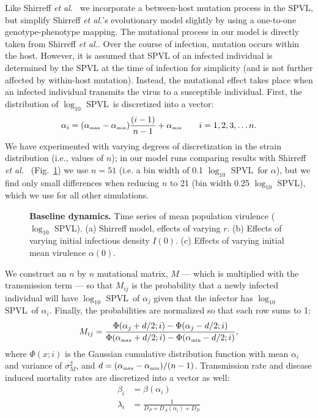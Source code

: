 \documentclass[10pt,letterpaper]{article}
\newcommand{\tsub}[2]{#1_{{\textrm{\tiny #2}}}}
\newcommand{\Lspvl}{$\log_{10}$ SPVL}
\newcommand{\etal}{\textit{et al.}}
\newcommand{\tsub}[2]{#1_{{\textrm{\tiny #2}}}}
\begin{document}
Like Shirreff \etal\ \cite{shirreff_transmission_2011} we incorporate a between-host mutation process in the SPVL, but simplify Shirreff \etal's evolutionary model slightly by using a one-to-one genotype-phenotype mapping. 
The mutational process in our model is directly taken from Shirreff \etal. Over the course of infection, mutation occurs within the host. However, it is assumed that SPVL of an infected individual is determined by the SPVL at the time of infection for simplicity (and is not further affected by within-host mutation). Instead, the mutational effect takes place when an infected individual transmits the virus to a susceptible individual. First, the distribution of \Lspvl\ is discretized into a vector:
\begin{equation}
\alpha_i =  (\tsub{\alpha}{max} - \tsub{\alpha}{min})\frac{(i-1)}{n-1} + \tsub{\alpha}{min} \qquad i = 1,2,3, \dots n.
\end{equation}
We have experimented with varying degrees of discretization in the strain distribution (i.e., values of $n$); in our model runs comparing results with Shirreff \etal\ \cite{shirreff_transmission_2011} (Fig.~\ref{fig:panel3}) we use $n=51$ (i.e. a bin width of 0.1 \Lspvl\ for $\alpha$), but we find only small differences when reducing $n$ to 21 (bin width 0.25 \Lspvl), which we use for all other simulations.

\begin{figure}[!h]
\caption{{\bf Baseline dynamics.}
Time series of mean population virulence (\Lspvl). (a) Shirreff model, effects of varying $r$. (b) Effects of varying initial infectious density $I(0)$. (c) Effects of varying initial mean virulence $\alpha(0)$.}
\label{fig:panel3}
\end{figure}

We construct an $n$ by $n$ mutational matrix, $M$ --- which is multiplied with the transmission term ---  so that $M_{ij}$ is the probability that a newly infected individual will have \Lspvl\ of $\alpha_j$ given that the infector has \Lspvl\ of $\alpha_i$. Finally, the probabilities are normalized so that each row sums to 1:
\begin{equation}
M_{ij} = \frac{\Phi(\alpha_j + d/2;i) - \Phi(\alpha_j - d/2;i)}{\Phi(\tsub{\alpha}{max} + d/2;i) - \Phi(\tsub{\alpha}{min} - d/2;i)},
\end{equation}
where $\Phi(x;i)$ is the Gaussian cumulative distribution function with mean $\alpha_i$ and variance of $\sigma_M^2$, and $d = (\tsub{\alpha}{max} - \tsub{\alpha}{min})/(n-1)$. Transmission rate and disease induced mortality rates are discretized into a vector as well:
\begin{equation}
\begin{aligned}
\beta_i &= \beta(\alpha_i)\\
\lambda_i &= \frac{1}{D_P + D_A (\alpha_i) + D_D}
\end{aligned}
\end{equation}
\end{document}

